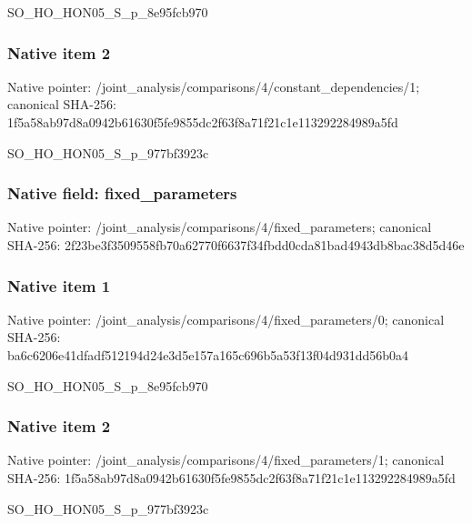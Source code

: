 \documentclass[10pt,a4paper]{article}
\begin{document}
\begingroup\raggedright\sloppy SO\_\allowbreak{}HO\_\allowbreak{}HON05\_\allowbreak{}S\_\allowbreak{}p\_\allowbreak{}8e95fcb970\par\endgroup

\subsubsection{Native item 2}
Native pointer: /joint\_\allowbreak{}analysis/comparisons/4/constant\_\allowbreak{}dependencies/1; canonical SHA-256: 1f5a58ab97d8a0942b61630f5fe9855dc2f63f8a71f21c1e113292284989a5fd

\begingroup\raggedright\sloppy SO\_\allowbreak{}HO\_\allowbreak{}HON05\_\allowbreak{}S\_\allowbreak{}p\_\allowbreak{}977bf3923c\par\endgroup

\subsubsection{Native field: fixed\_\allowbreak{}parameters}
Native pointer: /joint\_\allowbreak{}analysis/comparisons/4/fixed\_\allowbreak{}parameters; canonical SHA-256: 2f23be3f3509558fb70a62770f6637f34fbdd0cda81bad4943db8bac38d5d46e

\subsubsection{Native item 1}
Native pointer: /joint\_\allowbreak{}analysis/comparisons/4/fixed\_\allowbreak{}parameters/0; canonical SHA-256: ba6c6206e41dfadf512194d24e3d5e157a165c696b5a53f13f04d931dd56b0a4

\begingroup\raggedright\sloppy SO\_\allowbreak{}HO\_\allowbreak{}HON05\_\allowbreak{}S\_\allowbreak{}p\_\allowbreak{}8e95fcb970\par\endgroup

\subsubsection{Native item 2}
Native pointer: /joint\_\allowbreak{}analysis/comparisons/4/fixed\_\allowbreak{}parameters/1; canonical SHA-256: 1f5a58ab97d8a0942b61630f5fe9855dc2f63f8a71f21c1e113292284989a5fd

\begingroup\raggedright\sloppy SO\_\allowbreak{}HO\_\allowbreak{}HON05\_\allowbreak{}S\_\allowbreak{}p\_\allowbreak{}977bf3923c\par\endgroup
\end{document}
